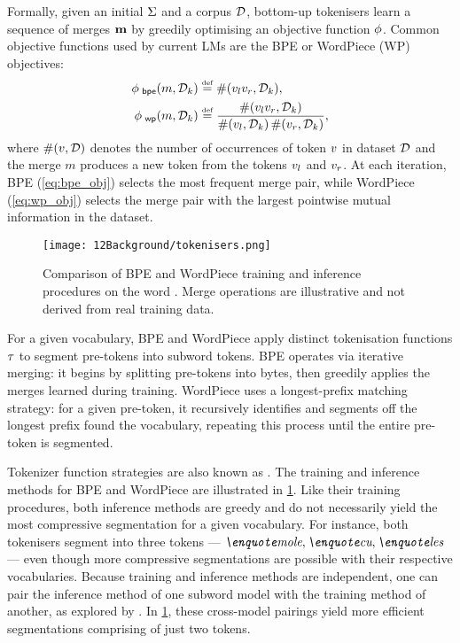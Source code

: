 Formally, given an initial $\Sigma$ and a corpus $\mathcal{D}$, bottom-up tokenisers learn a sequence of merges $\mathbf{m}$ by greedily optimising an objective function $\phi$. Common objective functions used by current LMs are the BPE or WordPiece (WP) objectives:
\begin{align}
    \bpeob(\merge, \dataset_k) &\defeq 
    \countfn(\lefttoken \righttoken, \dataset_k) \label{eq:bpe_obj}, \\
     \wpob(\merge, \dataset_k) &\defeq 
    \frac{
    \countfn(\lefttoken \righttoken, \dataset_k)}{\countfn(\lefttoken, \dataset_k)\,\countfn(\righttoken, \dataset_k)}, \label{eq:wp_obj}
\end{align}
where $\#(v, \mathcal{D})$ denotes the number of occurrences of token $v$ in dataset $\mathcal{D}$ and the merge $m$ produces a new token from the tokens $v_l$ and $v_r$. At each iteration, BPE (\cref{eq:bpe_obj}) selects the most frequent merge pair, while WordPiece (\cref{eq:wp_obj}) selects the merge pair with the largest pointwise mutual information in the dataset.

\begin{figure}[t]
    \centering
    \texttt{[image: 12Background/tokenisers.png]}
    \caption{Comparison of BPE and WordPiece training and inference procedures on the word . Merge operations are illustrative and not derived from real training data.}
    \label{fig:12-tokenisers}
\end{figure}

For a given vocabulary, BPE and WordPiece apply distinct tokenisation functions $\tau$ to segment pre-tokens into subword tokens. BPE operates via iterative merging: it begins by splitting pre-tokens into bytes, then greedily applies the merges learned during training. WordPiece uses a longest-prefix matching strategy: for a given pre-token, it recursively identifies and segments off the longest prefix found the vocabulary, repeating this process until the entire pre-token is segmented.

Tokenizer function strategies are also known as . The training and inference methods for BPE and WordPiece are illustrated in \cref{fig:12-tokenisers}. Like their training procedures, both inference methods are greedy and do not necessarily yield the most compressive segmentation for a given vocabulary. For instance, both tokenisers segment  into three tokens --- ${\ex{mole},\ex{cu},\ex{les}}$ --- even though more compressive segmentations are possible with their respective vocabularies. Because training and inference methods are independent, one can pair the inference method of one subword model with the training method of another, as explored by \citet{uzan-etal-2024-greed}. In \cref{fig:12-tokenisers}, these cross-model pairings yield more efficient segmentations comprising of just two tokens.

